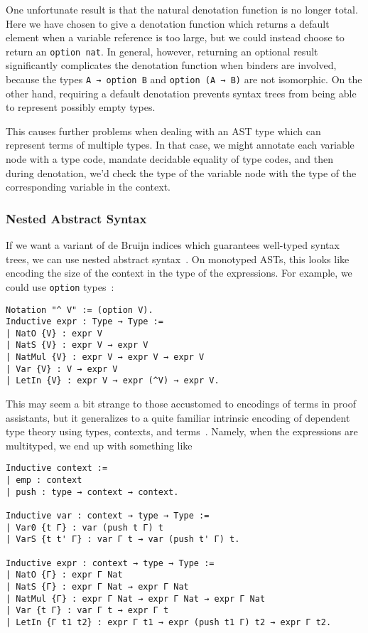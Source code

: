 One unfortunate result is that the natural denotation function is no longer total.
Here we have chosen to give a denotation function which returns a default element when a variable reference is too large, but we could instead choose to return an \texttt{option nat}.
In general, however, returning an optional result significantly complicates the denotation function when binders are involved, because the types \texttt{A → option B} and \texttt{option (A → B)} are not isomorphic.
On the other hand, requiring a default denotation prevents syntax trees from being able to represent possibly empty types.

This causes further problems when dealing with an AST type which can represent terms of multiple types.
In that case, we might annotate each variable node with a type code, mandate decidable equality of type codes, and then during denotation, we'd check the type of the variable node with the type of the corresponding variable in the context.

\subsubsection{Nested Abstract Syntax} \label{sec:binders:nested-abstract-syntax}
If we want a variant of de Bruijn indices which guarantees well-typed syntax trees, we can use nested abstract syntax~\cite{Nested2012Hirschowitz,deBruijn1999Bird}.
On monotyped ASTs, this looks like encoding the size of the context in the type of the expressions.
For example, we could use \texttt{option} types~\cite{Nested2012Hirschowitz}:
\begin{verbatim}
Notation "^ V" := (option V).
Inductive expr : Type → Type :=
| NatO {V} : expr V
| NatS {V} : expr V → expr V
| NatMul {V} : expr V → expr V → expr V
| Var {V} : V → expr V
| LetIn {V} : expr V → expr (^V) → expr V.
\end{verbatim}

This may seem a bit strange to those accustomed to encodings of terms in proof assistants, but it generalizes to a quite familiar intrinsic encoding of dependent type theory using types, contexts, and terms~\cite{Strongly2012Benton}.
Namely, when the expressions are multityped, we end up with something like
\begin{verbatim}
Inductive context :=
| emp : context
| push : type → context → context.

Inductive var : context → type → Type :=
| Var0 {t Γ} : var (push t Γ) t
| VarS {t t' Γ} : var Γ t → var (push t' Γ) t.

Inductive expr : context → type → Type :=
| NatO {Γ} : expr Γ Nat
| NatS {Γ} : expr Γ Nat → expr Γ Nat
| NatMul {Γ} : expr Γ Nat → expr Γ Nat → expr Γ Nat
| Var {t Γ} : var Γ t → expr Γ t
| LetIn {Γ t1 t2} : expr Γ t1 → expr (push t1 Γ) t2 → expr Γ t2.
\end{verbatim}

